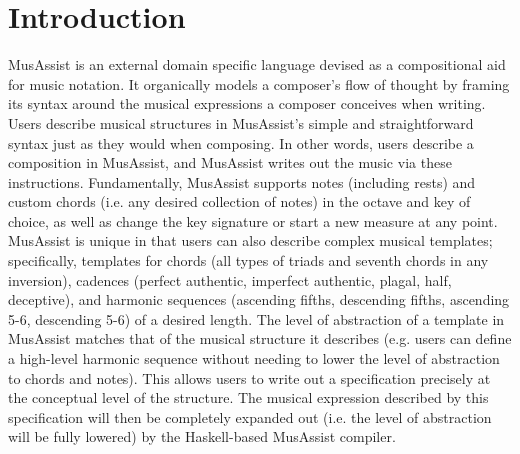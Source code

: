 \documentclass{article}
\title{\papertitle}
\begin{document}
%
\capstartfalse
\maketitle
\capstarttrue
%
\begin{abstract}
MusAssist is an external DSL devised as a compositional aid for music notation. 
Users can change key signatures, start a new measure, and describe musical structures 
such as notes, rests, and custom chords in MusAssist’s straightforward syntax much in 
the same way they would when composing. MusAssist is unique in that users can also describe 
complex musical templates for triads and seventh chords, cadences, and the four primary 
harmonic sequences with desired length. The level of abstraction of a MusAssist template 
MusAssist matches that of the theoretical musical structure it describes (e.g. users can describe
 a harmonic sequence without lowering the abstraction level to chords and notes). This allows 
 users to write out specifications precisely at the conceptual levels of the musical structures 
 they would organically conceive when composing by hand. The musical expressions described by 
 the specifications are expanded out (i.e. the level of abstraction is fully lowered) by the 
 Haskell-based MusAssist compiler and are translated to MusicXML, a language accepted by most 
 major notation software, allowing for further manual editing. 
\end{abstract}
%

\section{Introduction}\label{sec:introduction}
MusAssist is an external domain specific language devised as a compositional aid for music
notation. It organically models a composer’s flow of thought by framing its syntax around the musical expressions
a composer conceives when writing. Users describe musical structures in MusAssist’s simple and
straightforward syntax just as they would when composing. In other words, users
describe a composition in MusAssist, and MusAssist writes out the music via these instructions.
Fundamentally, MusAssist supports notes (including rests) and custom chords (i.e. any desired collection of notes)
in the octave and key of choice, as well as change the key signature or start a new measure at any
point. MusAssist is unique in that users can also describe complex musical templates;
specifically, templates for chords (all types of triads and seventh chords in any inversion), cadences
(perfect authentic, imperfect authentic, plagal, half, deceptive), and harmonic sequences (ascending
fifths, descending fifths, ascending 5-6, descending 5-6) of a desired length. The level of abstraction of a 
template in MusAssist matches that of the musical structure it describes (e.g. users can define a high-level harmonic 
sequence without needing to lower the level of abstraction to chords and notes). This allows users to write 
out a specification precisely at the conceptual level of the structure. The musical expression 
described by this specification will then be completely expanded out (i.e. the level of abstraction will be 
fully lowered) by the Haskell-based MusAssist compiler.
\end{document}
